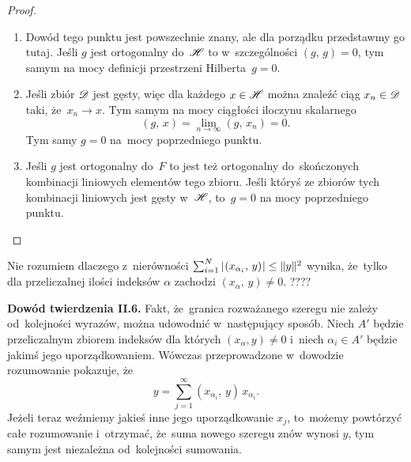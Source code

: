 \documentclass[a4paper,11pt]{article}
\numberwithin{equation}{section}
\begin{document}
\begin{proof}

  \begin{enumerate}
  \item Dowód tego punktu jest powszechnie znany, ale dla porządku
    przedstawmy go tutaj. Jeśli $g$ jest ortogonalny do~$\mathcal{H}$ to
    w~szczególności $( g, \, g ) = 0$, tym samym na mocy definicji
    przestrzeni Hilberta~$g = 0$.

  \item Jeśli zbiór $\mathcal{D}$ jest gęsty, więc dla każdego $x \in \mathcal{H}$
    można znaleźć ciąg $x_{ n } \in \mathcal{D}$ taki, że~$x_{ n } \to x$. Tym
    samym na mocy ciągłości iloczynu skalarnego
    \begin{equation}
      \label{eq:RS-Vol-I-s01-18}
      ( g, \, x ) = \lim_{ n \to \infty } ( g, \, x_{ n } ) = 0.
    \end{equation}
    Tym samy $g = 0$ na~mocy poprzedniego punktu.

  \item Jeśli $g$ jest ortogonalny do~$F$ to jest też ortogonalny
    do~skończonych kombinacji liniowych elementów tego zbioru. Jeśli
    któryś ze zbiorów tych kombinacji liniowych jest gęsty w~$\mathcal{H}$,
    to~$g = 0$ na mocy poprzedniego punktu.

  \end{enumerate}

\end{proof}

\VerSpaceFour





\noindent
{} Nie rozumiem dlaczego z~nierówności
$\sum_{ i = 1 }^{ N } | \hspace{0.05em}  ( x_{ \alpha_{ i } }, \,  y )  \hspace{0.05em} | \leq \lVert{ 
  y  }\rVert^{ 2 }$ wynika, że~tylko dla przeliczalnej ilości indeksów $\alpha$
zachodzi $( x_{ \alpha }, \, y ) \neq 0$. ????

\VerSpaceFour





\noindent
{} \textbf{Dowód twierdzenia II.6.} Fakt, że~granica
rozważanego szeregu nie zależy od~kolejności wyrazów, można udowodnić
w~następujący sposób. Niech $A'$ będzie przeliczalnym zbiorem indeksów
dla których $( x_{ \alpha }, y ) \neq 0$ i~niech $\alpha_{ i } \in A'$
będzie jakimś jego uporządkowaniem. Wówczas przeprowadzone w~dowodzie
rozumowanie pokazuje, że
\begin{equation}
  \label{eq:RS-Vol-I-s01-19}
  y = \sum_{ j = 1 }^{ \infty } ( x_{ \alpha_{ i } }, \, y ) \, x_{ \alpha_{ i } }.
\end{equation}
Jeżeli teraz weźmiemy jakieś inne jego uporządkowanie $x_{ j }$,
to~możemy powtórzyć całe rozumowanie i~otrzymać, że~suma nowego
szeregu znów wynosi $y$, tym samym jest niezależna od~kolejności
sumowania.
\end{document}
